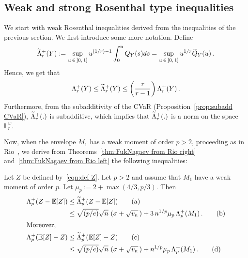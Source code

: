 \documentclass[10pt]{amsart}
\theoremstyle{definition}\newtheorem{defi}[theo]{Definition}\newtheorem{rema}[theo]{Remark}\newtheorem{exam}[theo]{Example}\newtheorem{exem}[theo]{Example}\newtheorem{nota}[theo]{Notation}
\newcommand{\bE}{\mathbb{E}}
\newcommand{\bL}{\mathbb{L}}
\let\oldtilde\tilde
\renewcommand*{\tilde}[1]{\mathchoice{\widetilde{#1}}{\widetilde{#1}}{\oldtilde{#1}}{\oldtilde{#1}}}
\begin{document}
\subsection{Weak and strong Rosenthal type inequalities}

We start with weak Rosenthal inequalities derived from the inequalities of the previous section. We first introduce some more notation. Define
\begin{equation}\label{eqn:def weak norm tilde}
\tilde{\Lambda}_r^+(Y):=\sup_{u\,\in\,]0,\,1]} u^{(1/r)-1}\int_0^u Q_Y(s)ds=\sup_{u\,\in\,]0,\,1]} u^{1/r}\tilde Q_Y(u)\,.
\end{equation}
Hence, we get that
\begin{equation}\label{eqn:bound Lambda by tildeLambda}
\Lambda_r^+(Y)\leq\tilde\Lambda_r^+(Y)\leq\left(\frac{r}{r-1}\right)\Lambda_r^+(Y)\,.
\end{equation}
Furthermore, from the subadditivity of the CVaR (Proposition~\ref{prop:subadd CVaR}), $\tilde\Lambda_r^+(.)$ is subadditive, which implies that $\tilde\Lambda_r^+(.)$ is a norm on the space $\bL_r^w$.

Now, when the envelope $M_1$ has a weak moment of order $p>2$, proceeding as in Rio~\cite{Rio17a}, we derive from Theorems~\ref{thm:FukNagaev from Rio right} and~\ref{thm:FukNagaev from Rio left} the following inequalities:

\begin{coro}\label{cor:weak moment ineq from Rio}
Let $Z$ be defined by~\eqref{eqn:def Z}. Let $p>2$ and assume that $M_1$ have a weak moment of order $p$. Let $\mu_p:=2+\max(4/3, p/3)$. Then
\begin{align*}
\Lambda_p^+(Z-\bE[Z])&\leq\tilde\Lambda_p^+(Z-\bE[Z])\tag{$\rm a$}\label{coro2.6.a}\\
&\leq \sqrt{(p/e)}\sqrt n\,\left(\sigma+\sqrt{v_n}\,\right)+3\,n^{1/p}\mu_p\,\Lambda_p^+ (M_1)\,.\tag{$\rm b$}\label{coro2.6.b}
\\
\intertext{Moreover,}
\Lambda_p^+(\bE[Z]-Z)&\leq \tilde\Lambda_p^+(\bE[Z]-Z)\tag{$\rm c$}\label{coro2.6.c}\\
&\leq \sqrt{(p/e)}\sqrt n\,\left(\sigma+\sqrt{v_n}\,\right)+n^{1/p}\mu_p\,\Lambda_p^+(M_1)\,.\tag{$\rm d$}\label{coro2.6.d}
\end{align*}
\end{coro}
\end{document}
